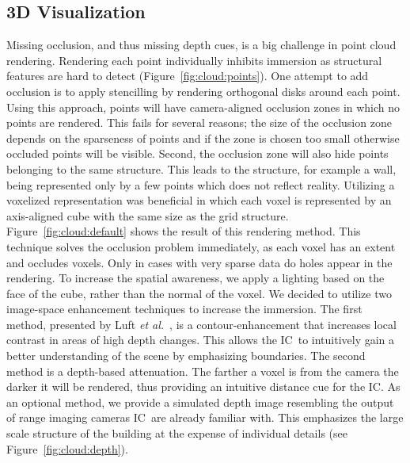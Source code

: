 \documentclass[conference,10pt,letter]{IEEEtran}
\def\IC{IC}
\def\etal{\textit{et al.}}
\begin{document}
\subsection{3D Visualization} \label{sec:overview:3dvisualization}
 Missing occlusion, and thus missing depth cues, is a big challenge in point cloud rendering. Rendering each point individually inhibits immersion as structural features are hard to detect (Figure~\ref{fig:cloud:points}). One attempt to add occlusion is to apply stencilling by rendering orthogonal disks around each point. Using this approach, points will have camera-aligned occlusion zones in which no points are rendered. This fails for several reasons; the size of the occlusion zone depends on the sparseness of points and if the zone is chosen too small otherwise occluded points will be visible. Second, the occlusion zone will also hide points belonging to the same structure. This leads to the structure, for example a wall, being represented only by a few points which does not reflect reality. Utilizing a voxelized representation was beneficial in which each voxel is represented by an axis-aligned cube with the same size as the grid structure. Figure~\ref{fig:cloud:default} shows the result of this rendering method. This technique solves the occlusion problem immediately, as each voxel has an extent and occludes voxels. Only in cases with very sparse data do holes appear in the rendering. To increase the spatial awareness, we apply a lighting based on the face of the cube, rather than the normal of the voxel. We decided to utilize two image-space enhancement techniques to increase the immersion. The first method, presented by Luft \etal~\cite{Luft06imageenhancement}, is a contour-enhancement that increases local contrast in areas of high depth changes. This allows the \IC\ to intuitively gain a better understanding of the scene by emphasizing boundaries. The second method is a depth-based attenuation. The farther a voxel is from the camera the darker it will be rendered, thus providing an intuitive distance cue for the \IC . As an optional method, we provide a simulated depth image resembling the output of range imaging cameras \IC\ are already familiar with. This emphasizes the large scale structure of the building at the expense of individual details (see Figure~\ref{fig:cloud:depth}).

\end{document}
